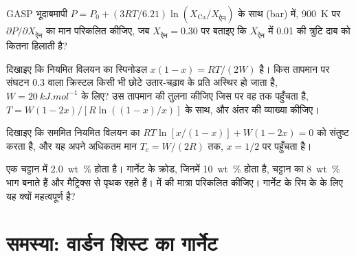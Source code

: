 \begin{exercise}[$\star\star$]\label{exo:b3:petrological-thermodynamics:9}
GASP भूदाबमापी $P = P_0 + (3RT/6.21)\ln(X_{\text{Ca}}/X_{\text{ऐन}})$ के साथ
(bar) में, \qty{900}{K} पर $\partial P/\partial X_{\text{ऐन}}$ का मान परिकलित कीजिए, जब
$X_{\text{ऐन}} = 0.30$ पर बताइए कि $X_{\text{ऐन}}$ में 0.01 की त्रुटि
दाब को कितना हिलाती है?
\end{exercise}

\begin{exercise}[$\star\star\star$]\label{exo:b3:petrological-thermodynamics:10}
दिखाइए कि नियमित विलयन का स्पिनोडल $x(1 - x) = RT/(2W)$ है। किस
तापमान पर संघटन 0.3 वाला क्रिस्टल किसी भी छोटे
उतार-चढ़ाव के प्रति अस्थिर हो जाता है, $W = \qty{20}{kJ.mol^{-1}}$ के लिए? उस तापमान की तुलना कीजिए
जिस पर वह  तक पहुँचता है, $T = W(1 - 2x)/[R\ln((1 - x)/x)]$ के साथ, और
अंतर की व्याख्या कीजिए।
\end{exercise}

\begin{exercise}[$\star\star\star$]\label{exo:b3:petrological-thermodynamics:11}
दिखाइए कि सममित नियमित विलयन का  $RT\ln[x/(1 -
x)] + W(1 - 2x) = 0$ को संतुष्ट करता है, और यह अपने अधिकतम मान $T_c = W/(2R)$ तक, $x
= 1/2$ पर पहुँचता है।
\end{exercise}

\begin{exercise}[$\star\star\star$]\label{exo:b3:petrological-thermodynamics:12}
एक चट्टान में \qty{2.0}{wt\percent}  होता है। गार्नेट के क्रोड, जिनमें
\qty{10}{wt\percent}  होता है, चट्टान का \qty{8}{wt\percent} भाग बनाते हैं और
मैट्रिक्स से पृथक रहते हैं।  में  की मात्रा
परिकलित कीजिए। गार्नेट के रिम के  के लिए यह क्यों महत्वपूर्ण है?
\end{exercise}

\section{समस्या: वार्डन शिस्ट का गार्नेट}

